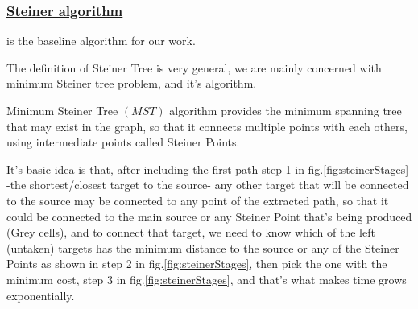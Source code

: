     \vspace{1cm}
    \subsubsection{\underline{Steiner algorithm}}
    \label{SteinerSection} is the baseline algorithm for our work.

    The definition of Steiner Tree is very general, we are mainly concerned with minimum Steiner tree problem,
    and it's algorithm.

    Minimum Steiner Tree $(MST)$ algorithm provides the minimum spanning tree that may exist in the graph,
    so that it connects multiple points with each others, using intermediate points called Steiner Points.

    It's basic idea is that, after including the first path step 1 in fig.\ref{fig:steinerStages} 
    -the shortest/closest target to the source-
    any other target that will be connected to the source may be connected to any point of the 
    extracted path, so that it could be connected to the main source or any Steiner Point that's being produced (Grey cells),
    and to connect that target, we need to know which of the left (untaken) targets has the minimum distance to the source
    or any of the Steiner Points as shown in step 2 in fig.\ref{fig:steinerStages}, 
    then pick the one with the minimum cost, step 3 in fig.\ref{fig:steinerStages},
    and that's what makes time grows exponentially.


